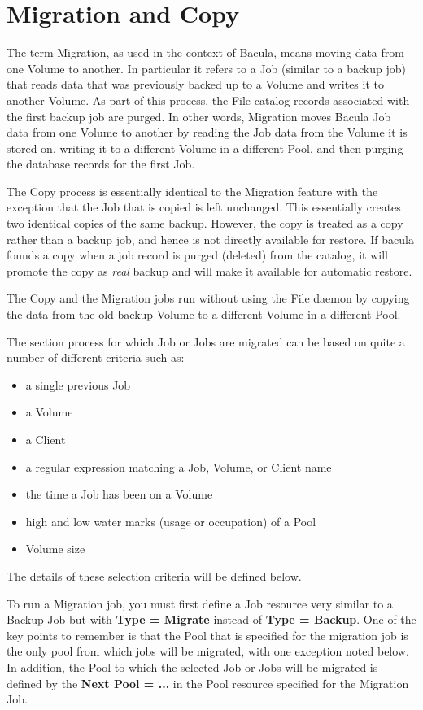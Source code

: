 
\chapter{Migration and Copy}
\label{MigrationChapter}

The term Migration, as used in the context of Bacula, means moving data from
one Volume to another.  In particular it refers to a Job (similar to a backup
job) that reads data that was previously backed up to a Volume and writes
it to another Volume.  As part of this process, the File catalog records
associated with the first backup job are purged.  In other words, Migration
moves Bacula Job data from one Volume to another by reading the Job data
from the Volume it is stored on, writing it to a different Volume in a
different Pool, and then purging the database records for the first Job.

The Copy process is essentially identical to the Migration feature with the
exception that the Job that is copied is left unchanged.  This essentially
creates two identical copies of the same backup. However, the copy is treated
as a copy rather than a backup job, and hence is not directly available for
restore. If bacula founds a copy when a job record is purged (deleted) from the
catalog, it will promote the copy as \textsl{real} backup and will make it
available for automatic restore. 

The Copy and the Migration jobs run without using the File daemon by copying
the data from the old backup Volume to a different Volume in a different Pool.

The section process for which Job or Jobs are migrated
can be based on quite a number of different criteria such as:
\begin{itemize} 
\item a single previous Job
\item a Volume
\item a Client
\item a regular expression matching a Job, Volume, or Client name
\item the time a Job has been on a Volume
\item high and low water marks (usage or occupation) of a Pool
\item Volume size
\end{itemize}

The details of these selection criteria will be defined below.

To run a Migration job, you must first define a Job resource very similar
to a Backup Job but with {\bf Type = Migrate} instead of {\bf Type =
Backup}.  One of the key points to remember is that the Pool that is 
specified for the migration job is the only pool from which jobs will
be migrated, with one exception noted below. In addition, the Pool to
which the selected Job or Jobs will be migrated is defined by the {\bf
Next Pool = ...} in the Pool resource specified for the Migration Job.

